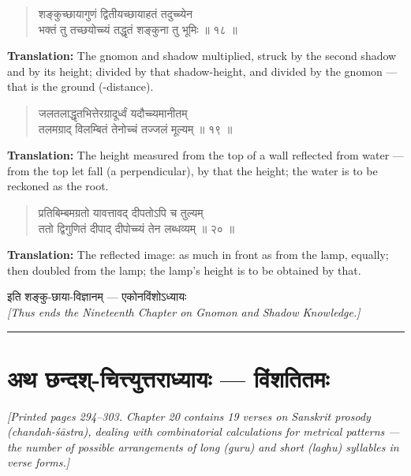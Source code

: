 \documentclass[11pt,a4paper]{article}
\newcommand{\longline}{\noindent\rule{\textwidth}{0.4pt}}
\newcommand{\cnote}[1]{\textcolor{notecolor}{\textit{#1}}}
\newcommand{\dev}[1]{{\devanagarifont #1}}
\newcommand{\dsec}[1]{\section*{\dev{#1}}}
\newenvironment{shloka}{\begin{verse}\devanagarifont\large}{\end{verse}}
\begin{document}
\vspace{0.3cm}

\begin{shloka}
शङ्कुच्छायागुणं द्वितीयच्छायाहतं तदुच्च्येन \\
भक्तं तु तच्छयोच्च्यं तद्धृतं शङ्कुना तु भूमिः ॥ १८ ॥
\end{shloka}

\textbf{Translation:}\quad
The gnomon and shadow multiplied, struck by the second shadow and by
its height; divided by that shadow-height, and divided by the gnomon
— that is the ground (-distance).

\vspace{0.3cm}

\begin{shloka}
जलतलाद्धृतभित्तेरग्रादूर्ध्वं यदौच्च्यमानीतम् \\
तलमग्राद् विलम्बितं तेनोच्चं तज्जलं मूल्यम् ॥ १९ ॥
\end{shloka}

\textbf{Translation:}\quad
The height measured from the top of a wall reflected from water —
from the top let fall (a perpendicular), by that the height; the
water is to be reckoned as the root.

\vspace{0.3cm}

\begin{shloka}
प्रतिबिम्बमग्रतो यावत्तावद् दीपतोऽपि च तुल्यम् \\
ततो द्विगुणितं दीपाद् दीपोच्च्यं तेन लब्धव्यम् ॥ २० ॥
\end{shloka}

\textbf{Translation:}\quad
The reflected image: as much in front as from the lamp, equally;
then doubled from the lamp; the lamp's height is to be obtained by
that.

\begin{center}
\dev{इति शङ्कु-छाया-विज्ञानम् — एकोनविंशोऽध्यायः}\\[0.3cm]
\textit{[Thus ends the Nineteenth Chapter on Gnomon and Shadow
Knowledge.]}
\end{center}

\longline
\newpage

\dsec{अथ छन्दश्-चित्त्युत्तराध्यायः — विंशतितमः}

\cnote{[Printed pages 294–303. Chapter 20 contains 19 verses on Sanskrit
prosody (chandah-śāstra), dealing with combinatorial calculations for
metrical patterns — the number of possible arrangements of long
(\textit{guru}) and short (\textit{laghu}) syllables in verse forms.]}
\end{document}
